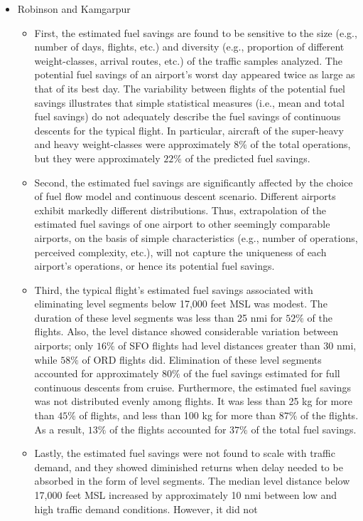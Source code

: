 \documentclass{aer1315-pretty}
\begin{document}
\begin{itemize}
\item Robinson and Kamgarpur \cite{Rob:2010} 
\begin{itemize}
\item First, the estimated fuel savings are found to be sensitive to the size (e.g., number of days, flights, etc.) and diversity (e.g., proportion of different weight-classes, arrival routes, etc.) of the traffic samples analyzed. The potential fuel savings of an airport’s worst day appeared twice as large as that of its best day. The variability between flights of the potential fuel savings illustrates that simple statistical measures (i.e., mean and total fuel savings) do not adequately describe the fuel savings of continuous descents for the typical flight. In particular, aircraft of the super-heavy and heavy weight-classes were approximately $8\%$ of the total operations, but they were approximately $22\%$ of the predicted fuel savings.
\item Second, the estimated fuel savings are significantly affected by the choice of fuel flow model and continuous descent scenario. Different airports exhibit
markedly different distributions. Thus, extrapolation of the estimated fuel savings of one airport to other seemingly comparable airports, on the basis of simple characteristics (e.g., number of operations, perceived complexity, etc.), will not capture the uniqueness of each airport’s operations, or hence its potential fuel savings.
\item Third, the typical flight’s estimated fuel savings associated with eliminating level segments below 17,000 feet MSL was modest. The duration of these level segments was less than 25 nmi for $52\%$ of the flights. Also, the level distance showed considerable variation between airports; only $16\%$ of SFO flights had level distances greater than 30 nmi, while $58\%$ of ORD flights did. Elimination of these level segments accounted for approximately $80\%$ of the fuel savings estimated for full continuous descents from cruise. Furthermore, the estimated fuel savings was not distributed evenly among flights. It was less than 25 kg for more than $45\%$ of flights, and less than 100 kg for more than $87\%$ of the flights. As a result, $13\%$ of the flights accounted for $37\%$ of the total fuel savings.
\item Lastly, the estimated fuel savings were not found to scale with traffic demand, and they showed diminished returns when delay needed to be absorbed in the form of level segments. The median level distance below 17,000 feet MSL increased by approximately 10 nmi between low and high traffic demand conditions. However, it did not

\end{itemize}
\end{itemize}
\end{document}

